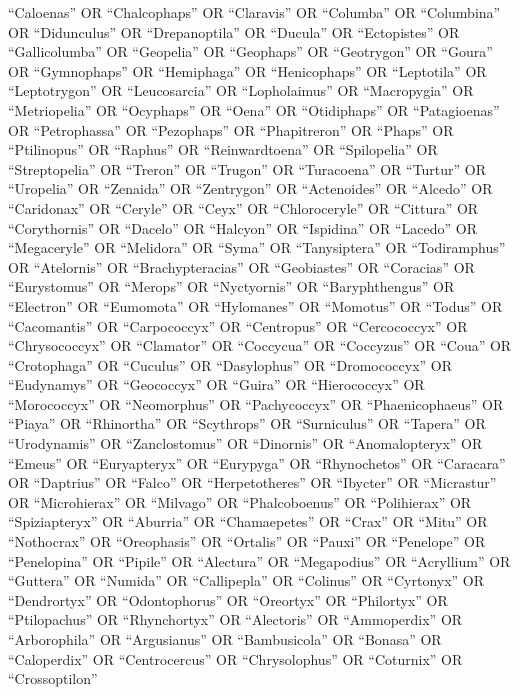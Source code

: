 \documentclass[
  number,
  review,
  onecolumn]{elsarticle}
\begin{document}
``Caloenas'' OR ``Chalcophaps'' OR ``Claravis'' OR ``Columba'' OR
``Columbina'' OR ``Didunculus'' OR ``Drepanoptila'' OR ``Ducula'' OR
``Ectopistes'' OR ``Gallicolumba'' OR ``Geopelia'' OR ``Geophaps'' OR
``Geotrygon'' OR ``Goura'' OR ``Gymnophaps'' OR ``Hemiphaga'' OR
``Henicophaps'' OR ``Leptotila'' OR ``Leptotrygon'' OR ``Leucosarcia''
OR ``Lopholaimus'' OR ``Macropygia'' OR ``Metriopelia'' OR ``Ocyphaps''
OR ``Oena'' OR ``Otidiphaps'' OR ``Patagioenas'' OR ``Petrophassa'' OR
``Pezophaps'' OR ``Phapitreron'' OR ``Phaps'' OR ``Ptilinopus'' OR
``Raphus'' OR ``Reinwardtoena'' OR ``Spilopelia'' OR ``Streptopelia'' OR
``Treron'' OR ``Trugon'' OR ``Turacoena'' OR ``Turtur'' OR ``Uropelia''
OR ``Zenaida'' OR ``Zentrygon'' OR ``Actenoides'' OR ``Alcedo'' OR
``Caridonax'' OR ``Ceryle'' OR ``Ceyx'' OR ``Chloroceryle'' OR
``Cittura'' OR ``Corythornis'' OR ``Dacelo'' OR ``Halcyon'' OR
``Ispidina'' OR ``Lacedo'' OR ``Megaceryle'' OR ``Melidora'' OR ``Syma''
OR ``Tanysiptera'' OR ``Todiramphus'' OR ``Atelornis'' OR
``Brachypteracias'' OR ``Geobiastes'' OR ``Coracias'' OR ``Eurystomus''
OR ``Merops'' OR ``Nyctyornis'' OR ``Baryphthengus'' OR ``Electron'' OR
``Eumomota'' OR ``Hylomanes'' OR ``Momotus'' OR ``Todus'' OR
``Cacomantis'' OR ``Carpococcyx'' OR ``Centropus'' OR ``Cercococcyx'' OR
``Chrysococcyx'' OR ``Clamator'' OR ``Coccycua'' OR ``Coccyzus'' OR
``Coua'' OR ``Crotophaga'' OR ``Cuculus'' OR ``Dasylophus'' OR
``Dromococcyx'' OR ``Eudynamys'' OR ``Geococcyx'' OR ``Guira'' OR
``Hierococcyx'' OR ``Morococcyx'' OR ``Neomorphus'' OR ``Pachycoccyx''
OR ``Phaenicophaeus'' OR ``Piaya'' OR ``Rhinortha'' OR ``Scythrops'' OR
``Surniculus'' OR ``Tapera'' OR ``Urodynamis'' OR ``Zanclostomus'' OR
``Dinornis'' OR ``Anomalopteryx'' OR ``Emeus'' OR ``Euryapteryx'' OR
``Eurypyga'' OR ``Rhynochetos'' OR ``Caracara'' OR ``Daptrius'' OR
``Falco'' OR ``Herpetotheres'' OR ``Ibycter'' OR ``Micrastur'' OR
``Microhierax'' OR ``Milvago'' OR ``Phalcoboenus'' OR ``Polihierax'' OR
``Spiziapteryx'' OR ``Aburria'' OR ``Chamaepetes'' OR ``Crax'' OR
``Mitu'' OR ``Nothocrax'' OR ``Oreophasis'' OR ``Ortalis'' OR ``Pauxi''
OR ``Penelope'' OR ``Penelopina'' OR ``Pipile'' OR ``Alectura'' OR
``Megapodius'' OR ``Acryllium'' OR ``Guttera'' OR ``Numida'' OR
``Callipepla'' OR ``Colinus'' OR ``Cyrtonyx'' OR ``Dendrortyx'' OR
``Odontophorus'' OR ``Oreortyx'' OR ``Philortyx'' OR ``Ptilopachus'' OR
``Rhynchortyx'' OR ``Alectoris'' OR ``Ammoperdix'' OR ``Arborophila'' OR
``Argusianus'' OR ``Bambusicola'' OR ``Bonasa'' OR ``Caloperdix'' OR
``Centrocercus'' OR ``Chrysolophus'' OR ``Coturnix'' OR ``Crossoptilon''
\end{document}
